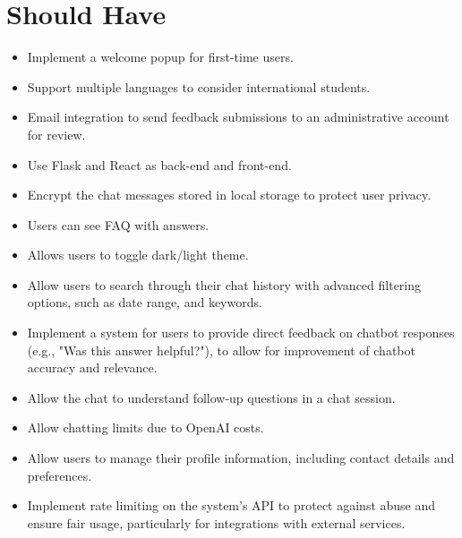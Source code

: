 \documentclass{l4proj}
\begin{document}
\section*{\textbf{Should Have}}

\begin{itemize}
    
    \item Implement a welcome popup for first-time users.

    \item Support multiple languages to consider international students.

    \item Email integration to send feedback submissions to an administrative account for review.

    \item Use Flask and React as back-end and front-end.

    \item Encrypt the chat messages stored in local storage to protect user privacy.
    
    \item Users can see FAQ with answers.

    \item Allows users to toggle dark/light theme.

    \item Allow users to search through their chat history with advanced filtering options, such as date range, and keywords.

    \item Implement a system for users to provide direct feedback on chatbot responses (e.g., "Was this answer helpful?"), to allow for improvement of chatbot accuracy and relevance.

    \item Allow the chat to understand follow-up questions in a chat session.

    \item Allow chatting limits due to OpenAI costs.

    \item  Allow users to manage their profile information, including contact details and preferences.

    \item Implement rate limiting on the system's API to protect against abuse and ensure fair usage, particularly for integrations with external services.

\end{itemize}
\end{document}
